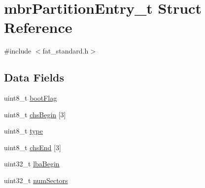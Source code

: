\hypertarget{structmbrPartitionEntry__t}{\section{mbr\+Partition\+Entry\+\_\+t Struct Reference}
\label{structmbrPartitionEntry__t}
}


{\ttfamily \#include $<$fat\+\_\+standard.\+h$>$}

\subsection*{Data Fields}
\begin{DoxyCompactItemize}
\item 
uint8\+\_\+t \hyperlink{structmbrPartitionEntry__t_aca2067f0a81c0e817a52c2aadfb781fe}{boot\+Flag}
\item 
uint8\+\_\+t \hyperlink{structmbrPartitionEntry__t_a609e5a1b9a3a29650d64ab1f54e62301}{chs\+Begin} \mbox{[}3\mbox{]}
\item 
uint8\+\_\+t \hyperlink{structmbrPartitionEntry__t_ab8abbfc312acb6e6fdf4e0b0bcd926d2}{type}
\item 
uint8\+\_\+t \hyperlink{structmbrPartitionEntry__t_a37e6d5fdcd3f2052c17621a1f3cd34db}{chs\+End} \mbox{[}3\mbox{]}
\item 
uint32\+\_\+t \hyperlink{structmbrPartitionEntry__t_a2cfdc8f79fc70a71230c1f387a7bc8d8}{lba\+Begin}
\item 
uint32\+\_\+t \hyperlink{structmbrPartitionEntry__t_af1bb8af8304f618b57809d5c33a5c898}{num\+Sectors}
\end{DoxyCompactItemize}


